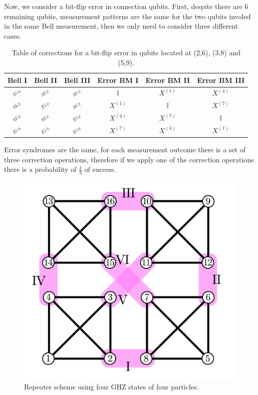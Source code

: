 \documentclass[10pt,a4paper]{book}
\numberwithin{equation}{chapter}
\numberwithin{figure}{chapter}
\numberwithin{table}{chapter}
\begin{document}
Now, we consider a bit-flip error in connection qubits. First, despite there are 6 remaining qubits, measurement patterns are the same for the two qubits involed in the same Bell measurement, then we only need to consider three different cases.
\begin{table}[H]
    \centering
    \begin{tabular}{|c c c|c|c|c|}
    \hline
   Bell I & Bell II & Bell III & Error BM I & Error BM II & Error BM III \\
    \hline
  $\psi^{\pm}$&$\phi^{\pm}$&$\phi^{\pm}$&$\mathbb{I}$&$X^{(1)}$&$X^{(4)}$ \\
  $\phi^{\pm}$&$\psi^{\pm}$&$\phi^{\pm}$&$X^{(1)}$&$\mathbb{I}$&$X^{(7)}$ \\
  $\phi^{\pm}$&$\phi^{\pm}$&$\psi^{\pm}$&$X^{(4)}$&$X^{(7)}$&$\mathbb{I}$\\
  $\psi^{\pm}$&$\psi^{\pm}$&$\psi^{\pm}$&$X^{(7)}$&$X^{(4)}$ &$X^{(1)}$\\
   \hline
    \end{tabular}
	\caption{\footnotesize Table of corrections for a bit-flip error in qubits located at (2,6), (3,8) and (5,9).}
	\label{tab:errorI}
\end{table}   
Error syndromes are the same, for each measurement outcome there is a set of three correction operations, therefore if we apply one of the correction operations there is a probability of $\frac{1}{3}$ of success.


\begin{figure}[H]
    \begin{center}
        \includegraphics[scale=0.2]{GHZ4.png}
    \end{center}
    \caption{\footnotesize Repeater scheme using four GHZ states of four particles.}
    \label{GHZ4}
\end{figure}
\end{document}
